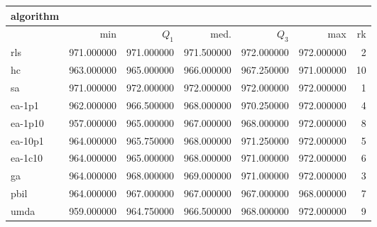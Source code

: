 \begin{tabular}{@{}l*{5}{>{{}}N{3}{0}}>{{}}N{2}{0}@{}}
\toprule
{algorithm} &  \\
\midrule
& {min} & {$Q_1$} & {med.} & {$Q_3$} & {max} & {rk}\\
\midrule
rls & {\color{blue}} 971.000000 & 971.000000 & 971.500000 & {\color{blue}} 972.000000 & {\color{blue}} 972.000000 & 2\\
hc & 963.000000 & 965.000000 & 966.000000 & 967.250000 & 971.000000 & 10\\
sa & {\color{blue}} 971.000000 & {\color{blue}} 972.000000 & {\color{blue}} 972.000000 & {\color{blue}} 972.000000 & {\color{blue}} 972.000000 & 1\\
ea-1p1 & 962.000000 & 966.500000 & 968.000000 & 970.250000 & {\color{blue}} 972.000000 & 4\\
ea-1p10 & 957.000000 & 965.000000 & 967.000000 & 968.000000 & {\color{blue}} 972.000000 & 8\\
ea-10p1 & 964.000000 & 965.750000 & 968.000000 & 971.250000 & {\color{blue}} 972.000000 & 5\\
ea-1c10 & 964.000000 & 965.000000 & 968.000000 & 971.000000 & {\color{blue}} 972.000000 & 6\\
ga & 964.000000 & 968.000000 & 969.000000 & 971.000000 & {\color{blue}} 972.000000 & 3\\
pbil & 964.000000 & 967.000000 & 967.000000 & 967.000000 & 968.000000 & 7\\
umda & 959.000000 & 964.750000 & 966.500000 & 968.000000 & {\color{blue}} 972.000000 & 9\\
\bottomrule
\end{tabular}
